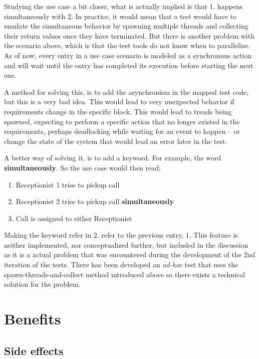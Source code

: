 \noindent Studying the use case a bit closer, what is actually implied is that 1. happens simultaneously with 2. In practice, it would mean that a test would have to emulate the simultaneous behavior by spawning multiple threads and collecting their return values once they have terminated. But there is another problem with the scenario above, which is that the test tools do not know when to parallelize. As of now, every entry in a use case scenario is modeled as a synchronous action and will wait until the entry has completed its execution before starting the next one.\medskip

\noindent A method for solving this, is to add the asynchronism in the mapped test code, but this is a very bad idea. This would lead to very unexpected behavior if requirements change in the specific block. This would lead to treads being spawned, expecting to perform a specific action that no longer existed in the requirements, perhaps deadlocking while waiting for an event to happen -- or change the state of the system that would lead an error later in the test.\medskip

\noindent A better way of solving it, is to add a keyword. For example, the word \textbf{simultaneously}. So the use case would then read;
\begin{enumerate}
 \item Receptionist 1 tries to pickup call
 \item Receptionist 2 tries to pickup call \textbf{simultaneously}
 \item Call is assigned to either Receptionist
\end{enumerate}
Making the keyword refer in 2. refer to the previous entry, 1. This feature is neither implemented, nor conceptualized further, but included in the discussion as it is a actual problem that was encountered during the development of the 2nd iteration of the tests. There has been developed an \emph{ad-hoc} test that uses the spawn-threads-and-collect method introduced above so there exists a technical solution for the problem.

\section{Benefits}
\subsection{Side effects}

